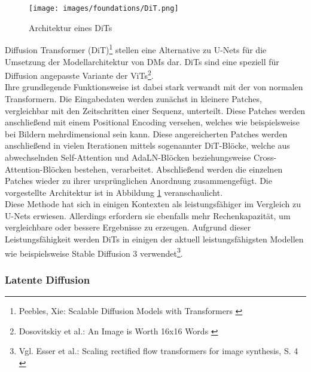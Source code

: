 \begin{figure}[ht]
    \centering
    \texttt{[image: images/foundations/DiT.png]} 
    \caption{Architektur eines \ac{DiT}s \cite{peebles2023scalable}}
    \label{fig:dit}
\end{figure}
Diffusion Transformer (\ac{DiT})\footnote{
    Peebles, Xie: Scalable Diffusion Models with Transformers
    \cite{peebles2023scalable}
} stellen eine Alternative zu U-Nets für die Umsetzung der Modellarchitektur von \ac{DM}s dar. \ac{DiT}s sind eine speziell für Diffusion angepasste Variante der \ac{ViT}s\footnote{
    Dosovitskiy et al.: An Image is Worth 16x16 Words 
    \cite{dosovitskiy2021imageworth16x16words}
}.\\
Ihre grundlegende Funktionsweise ist dabei stark verwandt mit der von normalen Transformern. Die Eingabedaten werden zunächst in kleinere Patches, vergleichbar mit den Zeitschritten einer Sequenz, unterteilt. Diese Patches werden anschließend mit einem Positional Encoding versehen, welches wie beispielsweise bei Bildern mehrdimensional sein kann. Diese angereicherten Patches werden anschließend in vielen Iterationen mittels sogenannter \ac{DiT}-Blöcke, welche aus abwechselnden Self-Attention und \ac{AdaLN}-Blöcken beziehungsweise Cross-Attention-Blöcken bestehen, verarbeitet. Abschließend werden die einzelnen Patches wieder zu ihrer ursprünglichen Anordnung zusammengefügt. Die vorgestellte Architektur ist in Abbildung \ref{fig:dit} veranschaulicht.\\
Diese Methode hat sich in einigen Kontexten als leistungsfähiger im Vergleich zu U-Nets erwiesen. Allerdings erfordern sie ebenfalls mehr Rechenkapazität, um vergleichbare oder bessere Ergebnisse zu erzeugen. Aufgrund dieser Leistungsfähigkeit werden \ac{DiT}s in einigen der aktuell leistungsfähigsten Modellen wie beispielsweise Stable Diffusion 3 verwendet\footnote{
    Vgl. Esser et al.: Scaling rectified flow transformers for image synthesis, S. 4
    \cite{esser2024scaling}
}.


\subsubsection{Latente Diffusion}

